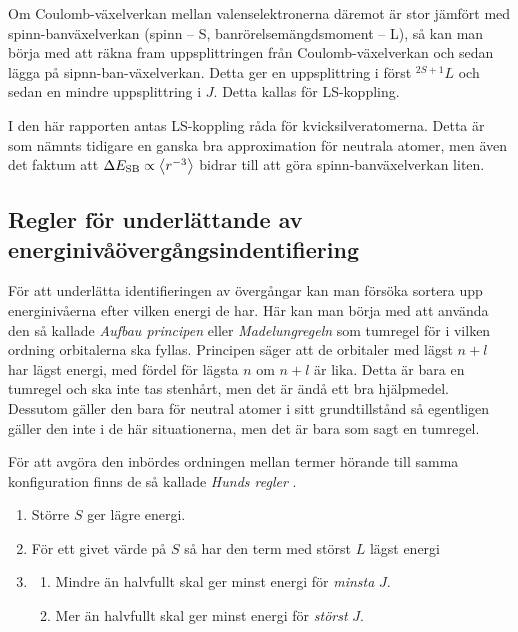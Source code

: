 \documentclass[11pt,a4paper]{article}
\begin{document}
Om Coulomb-växelverkan mellan valenselektronerna däremot är stor
jämfört med spinn-banväxelverkan (spinn -- S, banrörelsemängdsmoment
-- L), så kan man börja med att räkna fram uppsplittringen från
Coulomb-växelverkan och sedan lägga på sipnn-ban-växelverkan. Detta
ger en uppsplittring i först $^{2S+1}L$ och sedan en mindre
uppsplittring i $J$. Detta kallas för LS-koppling. 

I den här rapporten antas LS-koppling råda för
kvicksilveratomerna. Detta är som nämnts tidigare en ganska bra
approximation för neutrala atomer, men även det faktum att $\Delta
E_\text{SB} \propto \ev{r^{-3}}$ bidrar till att göra
spinn-banväxelverkan liten. 



\subsection{Regler för underlättande av energinivåövergångsindentifiering} 
\label{sec:regler}
För att underlätta identifieringen av övergångar kan man försöka
sortera upp energinivåerna efter vilken energi de har. Här kan man
börja med att använda den så kallade \emph{Aufbau principen} eller
\emph{Madelungregeln} som tumregel för i vilken ordning orbitalerna
ska fyllas\cite{wiki:aufbau}. Principen säger att de orbitaler med 
lägst $n+l$ har lägst energi, med fördel för lägsta $n$ om $n+l$ är
lika. Detta är bara en tumregel och ska inte tas stenhårt, men det 
är ändå ett bra hjälpmedel. Dessutom gäller den bara för neutral 
atomer i sitt grundtillstånd så egentligen gäller den inte i de här
situationerna, men det är bara som sagt en tumregel.

För att avgöra den inbördes ordningen mellan termer hörande till samma
konfiguration finns de så kallade \emph{Hunds regler} \cite{Bransden}. 
\begin{enumerate}
    \item Större $S$ ger lägre energi.
    \item För ett givet värde på $S$ så har den term med störst $L$ lägst energi
    \item 
    \begin{enumerate}
        \item Mindre än halvfullt skal ger minst energi för \emph{minsta} $J$.
        \item Mer än halvfullt skal ger minst energi för \emph{störst} $J$.
    \end{enumerate}
\end{enumerate}
\end{document}

